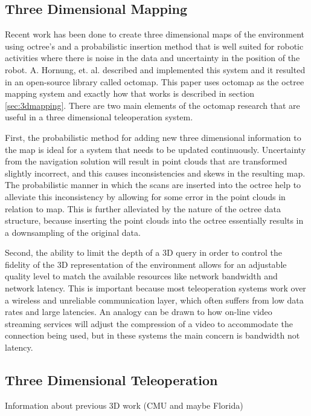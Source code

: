 \documentclass[journal]{IEEEtran}
\begin{document}
  \subsection{Three Dimensional Mapping}
  \label{sec:previouswork_3dmapping}
  Recent work has been done to create three dimensional maps of the
  environment using octree's and a probabilistic insertion method that is well
  suited for robotic activities where there is noise in the data and
  uncertainty in the position of the robot. A. Hornung, et. al. described and
  implemented this system and it resulted in an open-source library called
  octomap.\cite{octomap} This paper uses octomap as the octree mapping system
  and exactly how that works is described in section \ref{sec:3dmapping}.
  There are two main elements of the octomap research that are useful in a
  three dimensional teleoperation system.
  
  First, the probabilistic method for adding new three dimensional information
  to the map is ideal for a system that needs to be updated continuously.
  Uncertainty from the navigation solution will result in point clouds that 
  are transformed slightly incorrect, and this causes inconsistencies and 
  skews in the resulting map. The probabilistic manner in which the scans are 
  inserted into the octree help to alleviate this inconsistency by allowing 
  for some error in the point clouds in relation to map. This is further 
  alleviated by the nature of the octree data structure, because inserting the 
  point clouds into the octree essentially results in a downsampling of the 
  original data.
  
  Second, the ability to limit the depth of a 3D query in order to control the 
  fidelity of the 3D representation of the environment allows for an 
  adjustable quality level to match the available resources like network 
  bandwidth and network latency.  This is important because most teleoperation 
  systems work over a wireless and unreliable communication layer, which often 
  suffers from low data rates and large latencies.  An analogy can be drawn to 
  how on-line video streaming services will adjust the compression of a video 
  to accommodate the connection being used, but in these systems the main 
  concern is bandwidth not latency.
  
  \subsection{Three Dimensional Teleoperation}
  Information about previous 3D work (CMU and maybe Florida)
  
\end{document}
